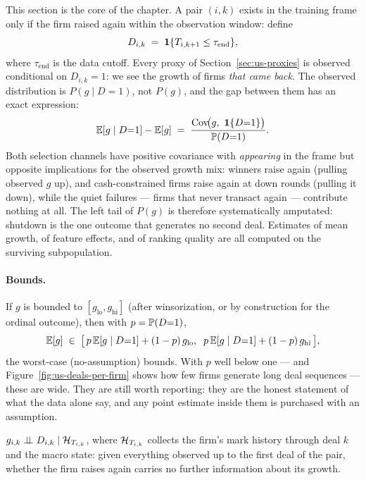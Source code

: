 This section is the core of the chapter. A pair $(i,k)$ exists in the training frame only
if the firm raised again within the observation window: define
\begin{equation}
D_{i,k} \;=\; \mathbf{1}\{T_{i,k+1} \le \tau_{\mathrm{end}}\},
\label{eq:us-selind}
\end{equation}
where $\tau_{\mathrm{end}}$ is the data cutoff. Every proxy of
Section~\ref{sec:us-proxies} is observed conditional on $D_{i,k} = 1$: we see the growth
of firms \emph{that came back}. The observed distribution is $P(g \mid D{=}1)$, not
$P(g)$, and the gap between them has an exact expression:
\begin{equation}
\mathbb{E}[g \mid D{=}1] - \mathbb{E}[g]
\;=\; \frac{\mathrm{Cov}\!\big(g,\ \mathbf{1}\{D{=}1\}\big)}{\mathbb{P}(D{=}1)} .
\label{eq:us-selbias}
\end{equation}
Both selection channels have positive covariance with \emph{appearing} in the frame but
opposite implications for the observed growth mix: winners raise again (pulling observed
$g$ up), and cash-constrained firms raise again at down rounds (pulling it down), while
the quiet failures --- firms that never transact again --- contribute nothing at all. The
left tail of $P(g)$ is therefore systematically amputated: shutdown is the one outcome
that generates no second deal. Estimates of mean growth, of feature effects, and of
ranking quality are all computed on the surviving subpopulation.

\paragraph{Bounds.}
If $g$ is bounded to $[g_{\mathrm{lo}}, g_{\mathrm{hi}}]$ (after winsorization, or by
construction for the ordinal outcome), then with $p = \mathbb{P}(D{=}1)$,
\begin{equation}
\mathbb{E}[g] \;\in\; \big[\, p\,\mathbb{E}[g \mid D{=}1] + (1-p)\,g_{\mathrm{lo}},\;\;
p\,\mathbb{E}[g \mid D{=}1] + (1-p)\,g_{\mathrm{hi}} \,\big],
\label{eq:us-bounds}
\end{equation}
the worst-case (no-assumption) bounds. With $p$ well below one --- and
Figure~\ref{fig:us-deals-per-firm} shows how few firms generate long deal sequences ---
these are wide. They are still worth reporting: they are the honest statement of what the
data alone say, and any point estimate inside them is purchased with an assumption.

\begin{assumption}
\label{ass:us-soh}
$g_{i,k} \perp\!\!\!\perp D_{i,k} \mid \mathcal{H}_{T_{i,k}}$, where $\mathcal{H}_{T_{i,k}}$ collects the firm's
mark history through deal $k$ and the macro state: given everything observed up to the
first deal of the pair, whether the firm raises again carries no further information about
its growth.
\end{assumption}

